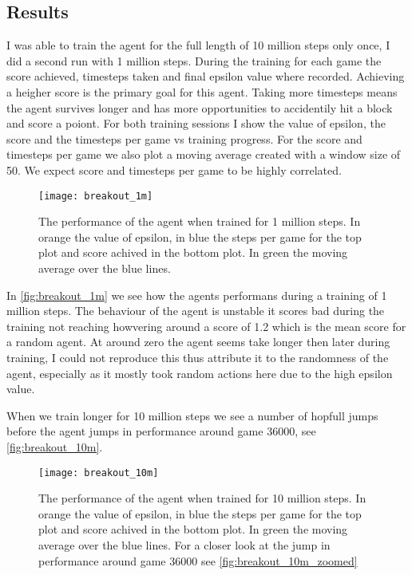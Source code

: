 \subsection{Results}
I was able to train the agent for the full length of 10 million steps only once, I did a second run with 1 million steps. During the training for each game the score achieved, timesteps taken and final epsilon value where recorded. Achieving a heigher score is the primary goal for this agent. Taking more timesteps means the agent survives longer and has more opportunities to accidentily hit a block and score a poiont. For both training sessions I show the value of epsilon, the score and the timesteps per game vs training progress. For the score and timesteps per game we also plot a moving average created with a window size of 50. We expect score and timesteps per game to be highly correlated. 

\begin{figure}
    \texttt{[image: breakout\_1m]}
    \caption{The performance of the agent when trained for 1 million steps. In orange the value of epsilon, in blue the steps per game for the top plot and score achived in the bottom plot. In green the moving average over the blue lines.}
    \label{fig:breakout_1m}
\end{figure}

In \autoref{fig:breakout_1m} we see how the agents performans during a training of 1 million steps. The behaviour of the agent is unstable it scores bad during the training not reaching howvering around a score of 1.2 which is the mean score for a random agent\cite{atari}. At around zero the agent seems take longer then later during training, I could not reproduce this thus attribute it to the randomness of the agent, especially as it mostly took random actions here due to the high epsilon value. 

When we train longer for 10 million steps we see a number of hopfull jumps before the agent jumps in performance around game $36000$, see \autoref{fig:breakout_10m}. 

\begin{figure}
    \texttt{[image: breakout\_10m]}
    \caption{The performance of the agent when trained for 10 million steps. In orange the value of epsilon, in blue the steps per game for the top plot and score achived in the bottom plot. In green the moving average over the blue lines. For a closer look at the jump in performance around game $36000$ see \autoref{fig:breakout_10m_zoomed}}
    \label{fig:breakout_10m}
\end{figure}

